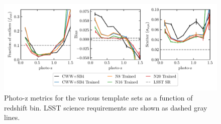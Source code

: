 \begin{figure}
    \centering
    \includegraphics{figures/photoz_binned_metrics.pdf}
    \caption{Photo-z metrics for the various template sets as a function of redshift bin. LSST science requirements are shown as dashed gray lines.}
    \label{fig:photoz_binned}
\end{figure}